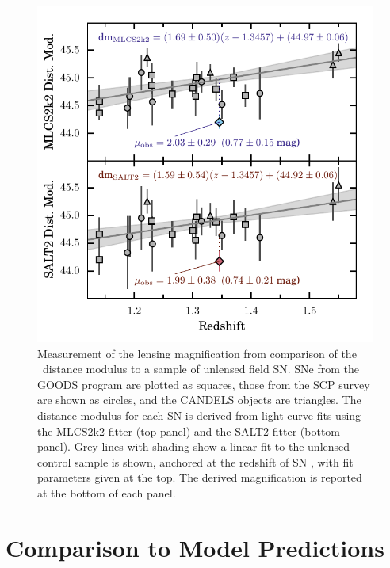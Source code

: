 \begin{figure}
\begin{center}
\includegraphics[width=\columnwidth]{FIG/snTomas_hubble_diagram}
\caption{ Measurement of the lensing magnification from comparison of
the \tomas\ distance modulus to a sample of unlensed field SN.  SNe
from the GOODS program are plotted as squares, those from the SCP
survey are shown as circles, and the CANDELS objects are triangles.
The distance modulus for each SN is derived from light curve fits
using the MLCS2k2 fitter (top panel) and the SALT2 fitter (bottom
panel).  Grey lines with shading show a linear fit to the
unlensed control sample is shown, anchored at the redshift of
SN \tomas, with fit parameters given at the top.  The derived
magnification is reported at the bottom of each panel.
\label{fig:MagnificationMeasurement} }
\end{center}
\end{figure}



\section{Comparison to Model Predictions}
\label{sec:Discussion}
\label{sec:ComparisonToModelPredictions}

